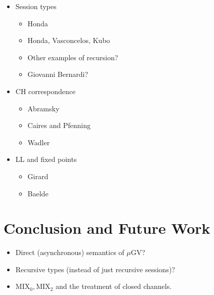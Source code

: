 \documentclass[orivec,envcountsame]{llncs}
\newcommand{\mugv}{$\mu\mathrm{GV}$\xspace}
\begin{document}
\begin{itemize}
\item Session types
  \begin{itemize}
  \item Honda
  \item Honda, Vasconcelos, Kubo
  \item Other examples of recursion?
  \item Giovanni Bernardi?
  \end{itemize}
\item CH correspondence
  \begin{itemize}
  \item Abramsky~\cite{Abramsky92,BellinScott94}
  \item Caires and Pfenning~\cite{CairesPfenning10}
  \item Wadler~\cite{Wadler12}
  \end{itemize}
\item LL and fixed points
  \begin{itemize}
  \item Girard~\cite{Girard87}
  \item Baelde~\cite{Baelde12}
  \end{itemize}
\end{itemize}

\section{Conclusion and Future Work}\label{sec:future}

\begin{itemize}
\item Direct (asynchronous) semantics of \mugv{}?
\item Recursive types (instead of just recursive sessions)?
\item $\mathrm{MIX}_0,\mathrm{MIX}_2$ and the treatment of closed channels.
\end{itemize}

\label{sect:bib}


\end{document}
